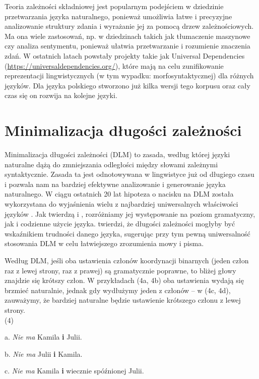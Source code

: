 \documentclass[licencjacka]{pracamgr_Kogni}
\begin{document}
Teoria zależności składniowej jest popularnym podejściem w dziedzinie przetwarzania języka naturalnego, ponieważ umożliwia łatwe i precyzyjne analizowanie struktury zdania i wyrażanie jej za pomocą drzew zależnościowych. Ma ona wiele zastosowań, np. w dziedzinach takich jak tłumaczenie maszynowe czy analiza sentymentu, ponieważ ułatwia przetwarzanie i rozumienie znaczenia zdań. W ostatnich latach powstały projekty takie jak Universal Dependencies (\url{https://universaldependencies.org/}), które mają na celu zunifikowanie reprezentacji lingwistycznych (w tym wypadku: morfosyntaktycznej) dla różnych języków. Dla języka polskiego stworzono już kilka wersji tego korpusu \citep{Przepiorkowski2020} oraz cały czas się on rozwija na kolejne języki.

\section{Minimalizacja długości zależności}
Minimalizacja długości zależności (DLM) to zasada, według której języki naturalne dążą do zmniejszania odległości między słowami zależnymi syntaktycznie. Zasada ta jest odnotowywana w lingwistyce już od długiego czasu i pozwala nam na bardziej efektywne analizowanie i generowanie języka naturalnego. W ciągu ostatnich 20 lat hipoteza o nacisku na DLM została wykorzystana do wyjaśnienia wielu z najbardziej uniwersalnych właściwości języków \citep{FutrellEtAl2015}.
Jak twierdzą \citet{Hawkins1994} i \citet{FutrellEtAl2020}, rozróżniamy jej występowanie na poziom gramatyczny, jak i codzienne użycie języka. \citet{Liu2008} twierdzi, że długości zależności mogłyby być wskaźnikiem trudności danego języka, sugerując przy tym pewną uniwersalność stosowania DLM w celu łatwiejszego zrozumienia mowy i pisma.

Według DLM, jeśli oba ustawienia członów koordynacji binarnych (jeden człon raz z lewej strony, raz z prawej) są gramatycznie poprawne, to bliżej głowy znajdzie się krótszy człon. W przykładach (4a, 4b) oba ustawienia wydają się brzmieć naturalnie, jednak gdy wydłużymy jeden z członów -- w (4c, 4d), zauważymy, że bardziej naturalne będzie ustawienie krótszego członu z lewej strony.
\\

(4)

a. \textit{Nie ma} Kamila \textbf{i} Julii.

b. \textit{Nie ma} Julii \textbf{i} Kamila.

c. \textit{Nie ma} Kamila \textbf{i} wiecznie spóźnionej Julii.
\end{document}
